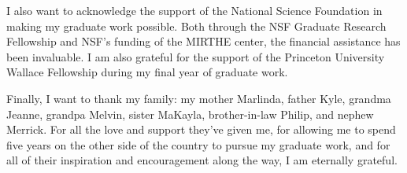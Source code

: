 I also want to acknowledge the support of the National Science Foundation in making my graduate work possible.  Both through the NSF Graduate Research Fellowship and NSF's funding of the MIRTHE center, the financial assistance has been invaluable.  I am also grateful for the support of the Princeton University Wallace Fellowship during my final year of graduate work.

Finally, I want to thank my family: my mother Marlinda, father Kyle, grandma Jeanne, grandpa Melvin, sister MaKayla, brother-in-law Philip, and nephew Merrick.   For all the love and support they've given me, for allowing me to spend five years on the other side of the country to pursue my graduate work, and for all of their inspiration and encouragement along the way, I am eternally grateful.

\clearpage

\cleardoublepage


